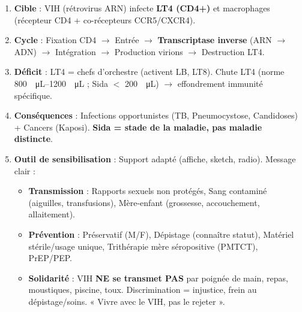 \documentclass[11pt]{article}
\begin{document}
\begin{methode}
\begin{enumerate}
\item \textbf{Cible} : VIH (rétrovirus ARN) infecte \textbf{LT4 (CD4+)} et macrophages (récepteur CD4 + co-récepteurs CCR5/CXCR4).
\item \textbf{Cycle} : Fixation CD4 $\rightarrow$ Entrée $\rightarrow$ \textbf{Transcriptase inverse} (ARN $\rightarrow$ ADN) $\rightarrow$ Intégration $\rightarrow$ Production virions $\rightarrow$ Destruction LT4.
\item \textbf{Déficit} : LT4 = chefs d'orchestre (activent LB, LT8). Chute LT4 (norme \SIrange{800}{1200}{\per\micro\liter} ; Sida $<$ \SI{200}{\per\micro\liter}) $\rightarrow$ effondrement immunité spécifique.
\item \textbf{Conséquences} : Infections opportunistes (TB, Pneumocystose, Candidoses) + Cancers (Kaposi). \textbf{Sida = stade de la maladie, pas maladie distincte}.
\item \textbf{Outil de sensibilisation} : Support adapté (affiche, sketch, radio). Message clair :
      \begin{itemize}
      \item \textbf{Transmission} : Rapports sexuels non protégés, Sang contaminé (aiguilles, transfusions), Mère-enfant (grossesse, accouchement, allaitement).
      \item \textbf{Prévention} : Préservatif (M/F), Dépistage (connaître statut), Matériel stérile/usage unique, Trithérapie mère séropositive (PMTCT), PrEP/PEP.
      \item \textbf{Solidarité} : VIH \textbf{NE se transmet PAS} par poignée de main, repas, moustiques, piscine, toux. Discrimination = injustice, frein au dépistage/soins. « Vivre avec le VIH, pas le rejeter ».
      \end{itemize}
\end{enumerate}
\end{methode}
\end{document}
